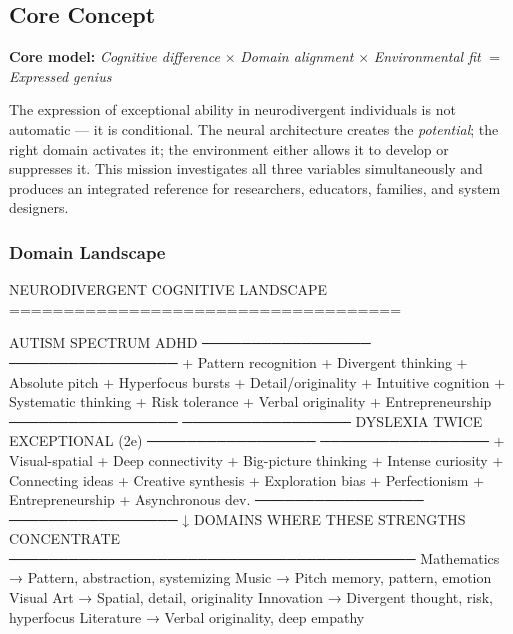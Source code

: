 \documentclass[11pt,letterpaper]{article}
\begin{document}
\subsection{Core Concept}

\textbf{Core model:} \textit{Cognitive difference} $\times$ \textit{Domain alignment} $\times$ \textit{Environmental fit} $=$ \textit{Expressed genius}

The expression of exceptional ability in neurodivergent individuals is not automatic — it is conditional. The neural architecture creates the \textit{potential}; the right domain activates it; the environment either allows it to develop or suppresses it. This mission investigates all three variables simultaneously and produces an integrated reference for researchers, educators, families, and system designers.

\subsubsection{Domain Landscape}

\begin{asciibox}
NEURODIVERGENT COGNITIVE LANDSCAPE
====================================

          AUTISM SPECTRUM            ADHD
          ─────────────────          ─────────────────
          + Pattern recognition      + Divergent thinking
          + Absolute pitch           + Hyperfocus bursts
          + Detail/originality       + Intuitive cognition
          + Systematic thinking      + Risk tolerance
          + Verbal originality       + Entrepreneurship
          ─────────────────          ─────────────────
          DYSLEXIA                   TWICE EXCEPTIONAL (2e)
          ─────────────────          ─────────────────
          + Visual-spatial           + Deep connectivity
          + Big-picture thinking     + Intense curiosity
          + Connecting ideas         + Creative synthesis
          + Exploration bias         + Perfectionism
          + Entrepreneurship         + Asynchronous dev.
          ─────────────────          ─────────────────
                        ↓
          DOMAINS WHERE THESE STRENGTHS CONCENTRATE
          ─────────────────────────────────────────
          Mathematics → Pattern, abstraction, systemizing
          Music       → Pitch memory, pattern, emotion
          Visual Art  → Spatial, detail, originality
          Innovation  → Divergent thought, risk, hyperfocus
          Literature  → Verbal originality, deep empathy
\end{asciibox}
\end{document}
